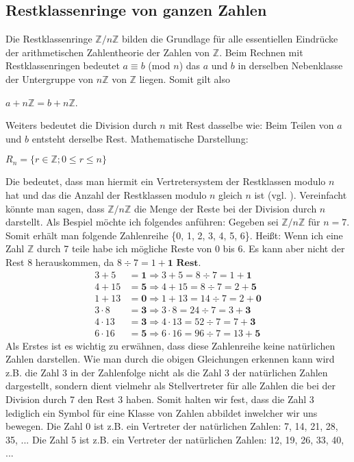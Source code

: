 \documentclass[german,12pt,a4paper]{article}
\begin{document}
\subsection{Restklassenringe von ganzen Zahlen}\label{Restklassenringe von ganzen Zahlen}
Die Restklassenringe $\mathbb{Z}/n\mathbb{Z}$ bilden die Grundlage für alle essentiellen Eindrücke der arithmetischen Zahlentheorie der Zahlen von $\mathbb{Z}$.
Beim Rechnen mit Restklassenringen bedeutet $a \equiv b$ (mod $n$) das $a$ und $b$ in derselben Nebenklasse der Untergruppe von $n\mathbb{Z}$ von $\mathbb{Z}$ liegen.
Somit gilt also
\begin{center}
$a + n\mathbb{Z} = b + n\mathbb{Z}$.
\end{center}
Weiters bedeutet die Division durch $n$ mit Rest dasselbe wie: Beim Teilen von $a$ und $b$ entsteht derselbe Rest.
Mathematische Darstellung:
\begin{center}
$R_n = \{r \in \mathbb{Z}; 0 \leq r \le n\}$
\end{center}
Die bedeutet, dass man hiermit ein Vertretersystem der Restklassen modulo $n$ hat und das die Anzahl der Restklassen modulo $n$ gleich $n$ ist (vgl. \cite[37--38]{Leutbecher2013}).
Vereinfacht könnte man sagen, dass $\mathbb{Z}/n\mathbb{Z}$ die Menge der Reste bei der Division durch $n$ darstellt.\newline
Als Bespiel möchte ich folgendes anführen:\newline
Gegeben sei $\mathbb{Z}/n \mathbb{Z}$ für $n = 7$.\newline
Somit erhält man folgende Zahlenreihe \{0, 1, 2, 3, 4, 5, 6\}.\newline
Heißt: Wenn ich eine Zahl $\mathbb{Z}$ durch 7 teile habe ich mögliche Reste von 0 bis 6.
Es kann aber nicht der Rest 8 herauskommen, da $8 \div 7 = 1 + \textbf{1 Rest}$.
\begin{align}
3 + 5      &= \textbf{1} \Rightarrow 3 + 5 = 8  \div 7 = 1 + \textbf{1} \\
4 + 15     &= \textbf{5} \Rightarrow 4 + 15 = 8  \div 7 = 2 + \textbf{5} \\
1 + 13     &= \textbf{0} \Rightarrow 1 + 13 = 14  \div 7 = 2 + \textbf{0} \\
3 \cdot 8  &= \textbf{3} \Rightarrow 3 \cdot 8 = 24 \div 7 = 3 + \textbf{3}\\
4 \cdot 13 &= \textbf{3} \Rightarrow 4 \cdot 13 = 52 \div 7 = 7 + \textbf{3}\\
6 \cdot 16 &= \textbf{5} \Rightarrow 6 \cdot 16 = 96 \div 7 = 13 + \textbf{5}
\end{align}
Als Erstes ist es wichtig zu erwähnen, dass diese Zahlenreihe keine natürlichen Zahlen darstellen.
Wie man durch die obigen Gleichungen erkennen kann wird z.B. die Zahl 3 in der Zahlenfolge nicht als die Zahl 3 der natürlichen Zahlen dargestellt, sondern dient vielmehr als Stellvertreter für alle Zahlen die bei der Division durch 7 den Rest 3 haben.
Somit halten wir fest, dass die Zahl 3 lediglich ein Symbol für eine Klasse von Zahlen abbildet inwelcher wir uns bewegen.\newline
Die Zahl 0 ist z.B. ein Vertreter der natürlichen Zahlen: 7, 14, 21, 28, 35, ...\newline
Die Zahl 5 ist z.B. ein Vertreter der natürlichen Zahlen: 12, 19, 26, 33, 40, ...
\end{document}
